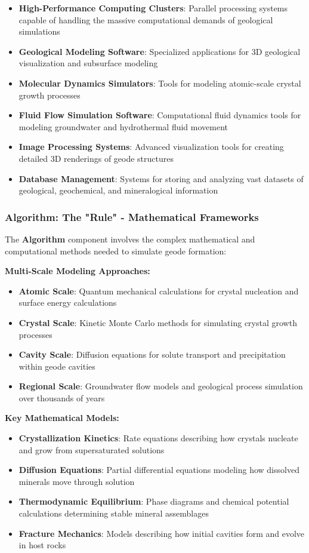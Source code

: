 \begin{itemize}
    \item \textbf{High-Performance Computing Clusters}: Parallel processing systems capable of handling the massive computational demands of geological simulations
    \item \textbf{Geological Modeling Software}: Specialized applications for 3D geological visualization and subsurface modeling
    \item \textbf{Molecular Dynamics Simulators}: Tools for modeling atomic-scale crystal growth processes
    \item \textbf{Fluid Flow Simulation Software}: Computational fluid dynamics tools for modeling groundwater and hydrothermal fluid movement
    \item \textbf{Image Processing Systems}: Advanced visualization tools for creating detailed 3D renderings of geode structures
    \item \textbf{Database Management}: Systems for storing and analyzing vast datasets of geological, geochemical, and mineralogical information
\end{itemize}

\subsubsection{Algorithm: The "Rule" - Mathematical Frameworks}

The \textbf{Algorithm} component involves the complex mathematical and computational methods needed to simulate geode formation:

\textbf{Multi-Scale Modeling Approaches:}
\begin{itemize}
    \item \textbf{Atomic Scale}: Quantum mechanical calculations for crystal nucleation and surface energy calculations
    \item \textbf{Crystal Scale}: Kinetic Monte Carlo methods for simulating crystal growth processes
    \item \textbf{Cavity Scale}: Diffusion equations for solute transport and precipitation within geode cavities
    \item \textbf{Regional Scale}: Groundwater flow models and geological process simulation over thousands of years
\end{itemize}

\textbf{Key Mathematical Models:}
\begin{itemize}
    \item \textbf{Crystallization Kinetics}: Rate equations describing how crystals nucleate and grow from supersaturated solutions
    \item \textbf{Diffusion Equations}: Partial differential equations modeling how dissolved minerals move through solution
    \item \textbf{Thermodynamic Equilibrium}: Phase diagrams and chemical potential calculations determining stable mineral assemblages
    \item \textbf{Fracture Mechanics}: Models describing how initial cavities form and evolve in host rocks
\end{itemize}

